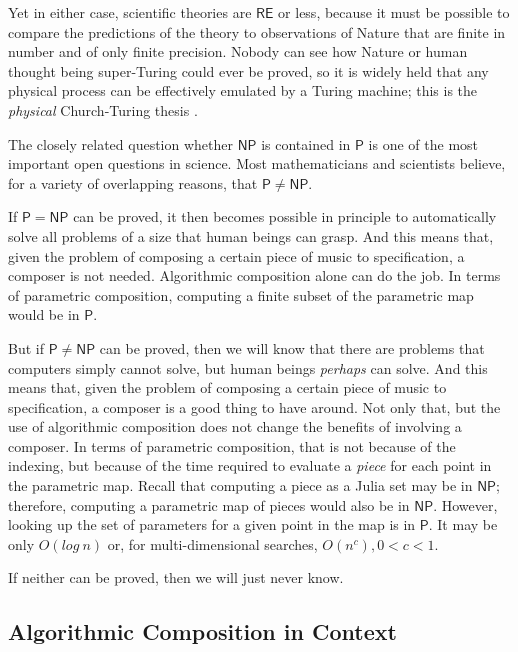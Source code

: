 \documentclass[11pt]{scrartcl}
\begin{document}
Yet in either case, scientific theories are $\mathsf{RE}$ or less, because it must be possible to compare the predictions of the theory to observations of Nature that are finite in number and of only finite precision. Nobody can see how Nature or human thought being super-Turing could ever be proved, so it is widely held that any physical process can be effectively emulated by a Turing machine; this is the \emph{physical} Church-Turing thesis \parencite{aaronson2005npcomplete, sep-church-turing}.

The closely related question whether $\mathsf{NP}$ is contained in $\mathsf{P}$ is one of the most important open questions in science. Most mathematicians and scientists believe, for a variety of overlapping reasons, that $\mathsf{P} \ne \mathsf{NP}$.

If $\mathsf{P} = \mathsf{NP}$  can be proved, it then becomes possible in principle to automatically solve all problems of a size that human beings can grasp. And this means that, given the problem of composing a certain piece of music to specification, a composer is not needed. Algorithmic composition alone can do the job. In terms of parametric composition, computing a finite subset of the parametric map would be in $\mathsf{P}$.

But if $\mathsf{P} \ne \mathsf{NP}$ can be proved, then we will know that there are problems that computers simply cannot solve, but human beings \emph{perhaps} can solve. And this means that, given the problem of composing a certain piece of music to specification, a composer is a good thing to have around. Not only that, but the use of algorithmic composition does not change the benefits of involving a composer.  In terms of parametric composition, that is not because of the indexing, but because of the time required to evaluate a \emph{piece} for each point in the parametric map. Recall that computing a piece as a Julia set may be in $\mathsf{NP}$; therefore, computing a parametric map of pieces would also be in $\mathsf{NP}$. However, looking up the set of parameters for a given point in the map is in $\mathsf{P}$. It may be only $O(log\ n)$ or, for multi-dimensional searches, $O(n^{c}), 0 < c < 1$.

If neither can be proved, then we will just never know.
 
\subsection*{Algorithmic Composition in Context}
\end{document}
